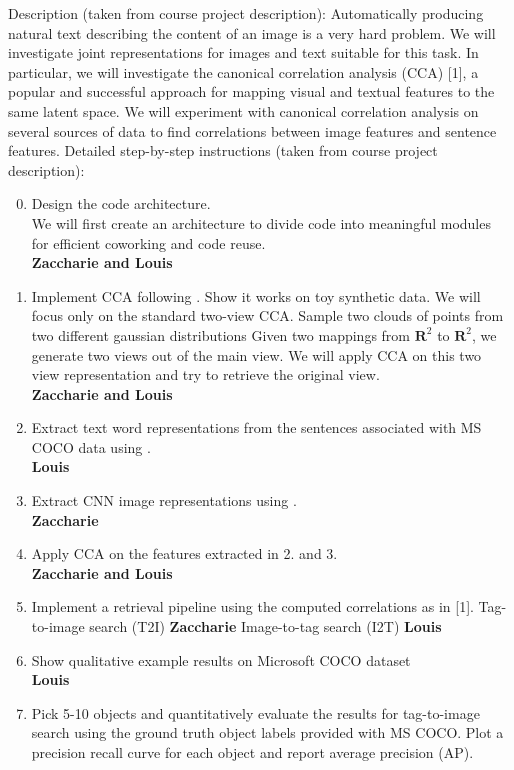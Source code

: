 \documentclass[a4paper,12pt]{article}
\begin{document}
Description (taken from course project description): Automatically producing natural text describing the content of an image is a very hard problem. We will investigate joint representations for images and text suitable for this task. In particular, we will investigate the canonical correlation analysis (CCA) [1], a popular and successful approach for mapping visual and textual features to the same latent space. We will experiment with canonical correlation analysis on several sources of data to find correlations between image features and sentence features.
Detailed step-by-step instructions (taken from course project description):
\begin{enumerate}
  \setcounter{enumi}{-1}
  \item Design the code architecture.\\
  We will first create an architecture to divide code into meaningful modules for
  efficient coworking and code reuse.
  \\\textbf{Zaccharie and Louis}
  \item Implement CCA following \cite{normalizedcca}. Show it works on toy synthetic data.
  We will focus only on the standard two-view CCA.
    \subitem Sample two clouds of points from two different gaussian distributions
    \subitem Given two mappings from $\mathbf{R}^2$ to $\mathbf{R}^2$, we generate two views out of the main view.
    \subitem We will apply CCA on this two view representation and try to retrieve the original view.
  \\\textbf{Zaccharie and Louis}
  \item Extract text word representations from the sentences associated with MS COCO data using \cite{word2vec}.
  \\\textbf{Louis}
  \item Extract CNN image representations using \cite{overfeat}.
  \\\textbf{Zaccharie}
  \item Apply CCA on the features extracted in 2. and 3.
  \\\textbf{Zaccharie and Louis}
  \item Implement a retrieval pipeline using the computed correlations as in [1].
    \subitem Tag-to-image search (T2I)
    \textbf{Zaccharie}
    \subitem Image-to-tag search (I2T)
    \textbf{Louis}
  \item Show qualitative example results on Microsoft COCO dataset
  \\\textbf{Louis}
  \item Pick 5-10 objects and quantitatively evaluate the results for tag-to-image search using the ground truth object labels provided with MS COCO. Plot a precision recall curve for each object and report average precision (AP).

\end{enumerate}
\end{document}
